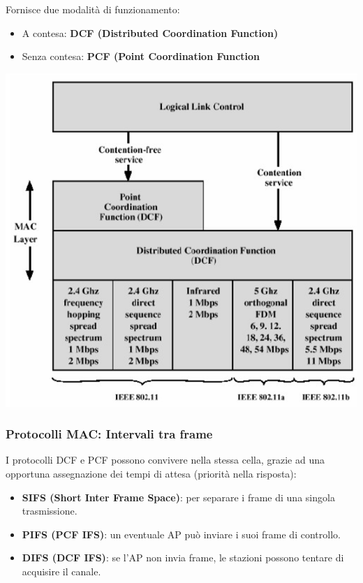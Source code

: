         Fornisce due modalità di funzionamento:
        \begin{itemize}
            \item A contesa: \textbf{DCF (Distributed Coordination Function)}
            \item Senza contesa: \textbf{PCF (Point Coordination Function}
        \end{itemize}

        \begin{center}
            \includegraphics[scale=0.55]{chapters/3/assets/schema_u.png}
        \end{center}

        \subsubsection{Protocolli MAC: Intervali tra frame}
            I protocolli DCF e PCF possono convivere nella stessa cella, grazie ad una opportuna assegnazione dei tempi di attesa (priorità nella risposta):
            \begin{itemize}
                \item \textbf{SIFS (Short Inter Frame Space)}: per separare i frame di una singola trasmissione.
                \item \textbf{PIFS (PCF IFS)}: un eventuale AP può inviare i suoi frame di controllo.
                \item \textbf{DIFS (DCF IFS)}: se l'AP non invia frame, le stazioni possono tentare di acquisire il canale.
            \end{itemize}

